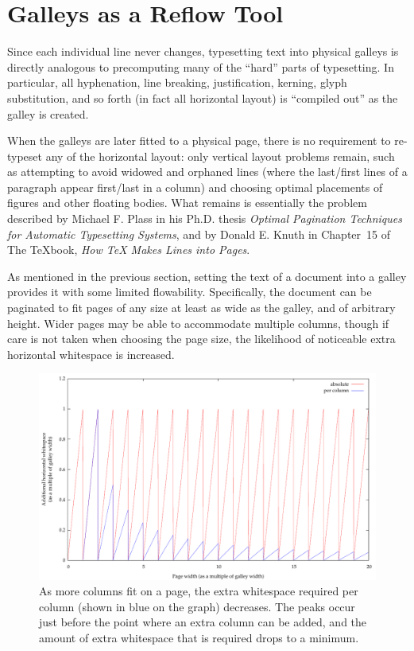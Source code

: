 \section{Galleys as a Reflow Tool}
\label{sec:singlegalleymetric}
Since each individual line never changes, typesetting text into physical galleys is directly analogous to precomputing many of the ``hard'' parts of typesetting. In particular, all hyphenation, line breaking, \gls{justification}, \gls{kerning}, \gls{glyph} substitution, and so forth (in fact all horizontal layout) is ``compiled out'' as the galley is created.

When the galleys are later fitted to a physical page, there is no requirement to re-typeset any of the horizontal layout: only vertical layout problems remain, such as attempting to avoid widowed and orphaned lines (where the last/\hspace{0pt}first lines of a paragraph appear first/\hspace{0pt}last in a column) and choosing optimal placements of figures and other floating bodies. What remains is essentially the problem described by Michael F. Plass in his Ph.D. thesis \emph{Optimal Pagination Techniques for Automatic Typesetting Systems},\hspace{0pt}\cite{Plass1981} and by Donald E. Knuth in Chapter~15 of The \TeX{}book, \emph{How \TeX{} Makes Lines into Pages}.\hspace{0pt}\cite{Knuth1984}

As mentioned in the previous section, setting the text of a document into a galley provides it with some limited flowability. Specifically, the document can be paginated to fit pages of any size at least as wide as the galley, and of arbitrary height. Wider pages may be able to accommodate multiple columns, though if care is not taken when choosing the page size, the likelihood of noticeable extra horizontal whitespace is increased.


\begin{figure}
 \includegraphics[height=0.5\textheight]{gnuplot/1col} %
 \caption[Extra whitespace in a single-galley document]{As more columns fit on a page, the extra whitespace required per column (shown in blue on the graph) decreases. The peaks occur just before the point where an extra column can be added, and the amount of extra whitespace that is required drops to a minimum.}
 \label{fig:sawtooth}
\end{figure}


